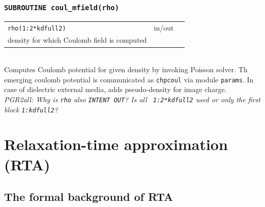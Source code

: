 \documentclass[final,1p]{elsarticle}
\newcommand{\PGRcomm}[1]{{\color{blue}\small\em PGR2all: #1}}
\begin{document}
\subsubsection*{\tt SUBROUTINE coul\_mfield(rho)}
\begin{tabular}{lcl}
 {\tt rho(1:2*kdfull2)} & in/out & \\ density for which Coulomb field
 is computed
\end{tabular}
\\[4pt]
Computes Coulomb potential for given density by invoking
Poisson solver.
Th emerging coulomb potential is communicated as {\tt chpcoul}
via module {\tt params}.
In case of dielectric external media, adds pseudo-density for image
charge.
\\
\PGRcomm{Why is {\tt rho} also {\tt INTENT OUT}? Is all {\tt
    1:2*kdfull2} used or only the first block {\tt 1:kdfull2}?}







\section{Relaxation-time approximation (RTA)}
\label{sec:RTA}

\subsection{The formal background of RTA}
\end{document}
